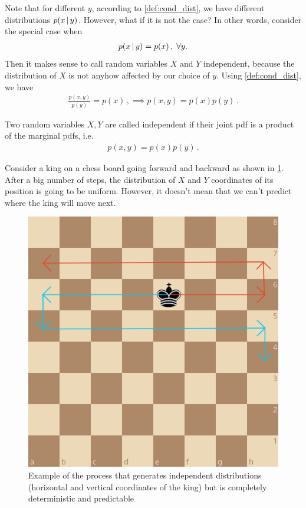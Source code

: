 Note that for different $y$, according to \cref{def:cond_dist}, we have different distributions $p(x\,|\, y)$.
However, what if it is not the case?
In other words, consider the special case when
\begin{align}
    p(x\,|\, y) = p(x)\,,\; \forall y.
\end{align}
Then it makes sense to call random variables $X$ and $Y$ independent, because the distribution of $X$ is not anyhow affected by our choice of $y$.
Using \cref{def:cond_dist}, we have
\begin{align}
    \frac{p(x,y)}{p(y)} = p(x)\,, \implies p(x,y) = p(x)p(y)\,.
\end{align}

\begin{mybox}
\begin{definition}\label{def:independent_rvs}
    Two random variables $X,Y$ are called independent if their joint pdf is a product of the marginal pdfs, i.e.
    \begin{align}
        p(x,y) = p(x)p(y)\,.
    \end{align}
\end{definition}
\end{mybox}
\begin{example}
    Consider a king on a chess board going forward and backward as shown in \cref{fig:chess_king}. After a big number of steps, the distribution of $X$ and $Y$ coordinates of its position is going to be uniform. However, it doesn't mean that we can't predict where the king will move next.
\end{example}
\begin{figure}[t]
    \centering
    \includegraphics[width=0.3\linewidth]{pics/chess_king.png}
    \caption{Example of the process that generates independent distributions (horizontal and vertical coordinates of the king) but is completely deterministic and predictable}
    \label{fig:chess_king}
\end{figure}

